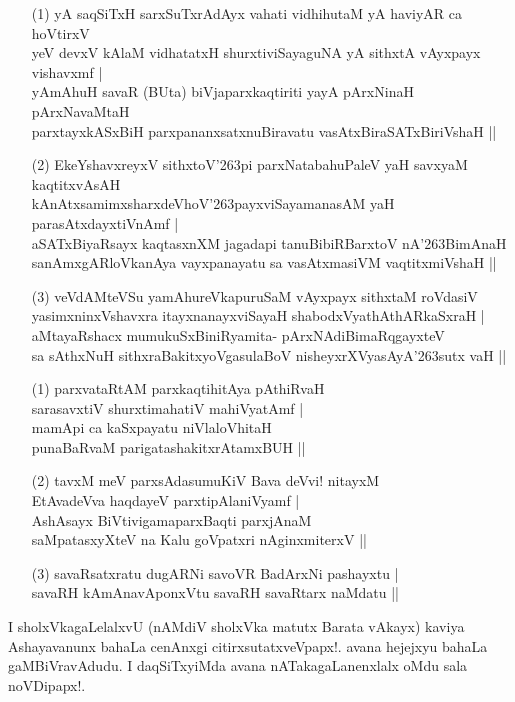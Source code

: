 \begin{itemize}
\item[(1)] yA saqSiTxH sarxSuTxrAdAyx vahati vidhihutaM yA haviyAR ca hoVtirxV \\
yeV devxV kAlaM vidhatatxH shurxtiviSayaguNA yA sithxtA vAyxpayx vishavxmf |\\
yAmAhuH savaR (BUta) biVjaparxkaqtiriti yayA pArxNinaH pArxNavaMtaH \\
parxtayxkASxBiH parxpananxsatxnuBiravatu vasAtxBiraSATxBiriVshaH ||
\item[(2)] EkeYshavxreyxV sithxtoV\char'263pi parxNatabahuPaleV yaH savxyaM kaqtitxvAsAH \\
kAnAtxsamimxsharxdeVhoV\char'263payxviSayamanasAM yaH parasAtxdayxtiVnAmf |\\
aSATxBiyaRsayx kaqtasxnXM jagadapi tanuBibiRBarxtoV nA\char'263BimAnaH\\
sanAmxgARloVkanAya vayxpanayatu sa vasAtxmasiVM vaqtitxmiVshaH ||
\item[(3)] veVdAMteVSu yamAhureVkapuruSaM vAyxpayx sithxtaM roVdasiV\\
yasimxninxVshavxra itayxnanayxviSayaH shabodxVyathAthARkaSxraH |\\
aMtayaRshacx mumukuSxBiniRyamita- pArxNAdiBimaRqgayxteV \\
sa sAthxNuH sithxraBakitxyoVgasulaBoV nisheyxrXVyasAyA\char'263sutx vaH ||
\end{itemize}

\begin{itemize}
\item[(1)] parxvataRtAM parxkaqtihitAya pAthiRvaH\\
sarasavxtiV shurxtimahatiV mahiVyatAmf |\\
mamApi ca kaSxpayatu niVlaloVhitaH \\
punaBaRvaM parigatashakitxrAtamxBUH ||
\item[(2)] tavxM meV parxsAdasumuKiV Bava deVvi! nitayxM\\
EtAvadeVva haqdayeV parxtipAlaniVyamf |\\
AshAsayx BiVtivigamaparxBaqti parxjAnaM \\
saMpatasxyXteV na Kalu goVpatxri nAginxmiterxV ||
\item[(3)] savaRsatxratu dugARNi savoVR BadArxNi pashayxtu |\\
savaRH kAmAnavAponxVtu savaRH savaRtarx naMdatu ||
\end{itemize}

I sholxVkagaLelalxvU (nAMdiV sholxVka matutx Barata vAkayx) kaviya Ashayavanunx bahaLa cenAnxgi citirxsutatxveVpapx!. avana hejejxyu bahaLa gaMBiVravAdudu. I daqSiTxyiMda avana nATakagaLanenxlalx oMdu sala noVDipapx!.

